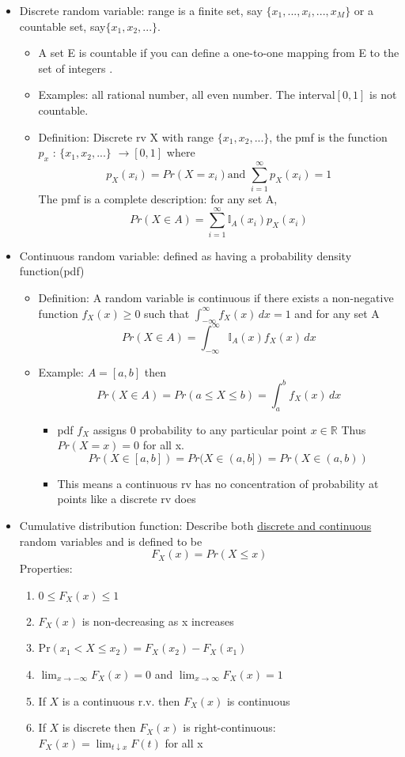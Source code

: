 \documentclass[12pt]{article}
\begin{document}
\begin{itemize}
\begin{itemize}
\end{itemize}
\item Discrete random variable: range is a finite set, say $\{x_1,...,x_i,...,x_M \}$ or a countable set, say$\{x_1,x_2,... \}$.
\begin{itemize}
\item A set E is countable if you can define a one-to-one mapping from E to the set of integers .
\item Examples: all rational number, all even number. The interval$[0,1]$ is not countable.
\item Definition: Discrete rv X with range $\{x_1,x_2,... \}$, the pmf is the function $p_x$ : $\{x_1,x_2,... \}$ $\rightarrow [0,1]$ where 
$$p_X(x_i) = Pr(X=x_i) \textrm{and } \sum_{i=1}^\infty p_X(x_i) = 1 $$ 
The pmf is a complete description: for any set A,
$$ Pr(X \in A) = \sum_{i=1}^\infty \mathbb{I}_A(x_i)p_X(x_i) $$

\end{itemize}
\item Continuous random variable: defined as having a probability density function(pdf)
\begin{itemize}
\item Definition: A random variable is continuous if there exists a non-negative function $f_X(x) \ge 0 $ such that $\int_{-\infty}^\infty f_X(x) \, dx = 1$ and for any set A
$$ Pr(X \in A) = \int_{-\infty}^\infty \mathbb{I}_A(x)f_X(x) \, dx  $$
\item Example: $A = [a,b]$ then 
$$Pr(X \in A) = Pr(a \le X \le b) = \int_a^b f_X(x) \, dx$$
\begin{itemize}
\item pdf $f_X$ assigns 0 probability to any particular point $x \in \mathbb{R}$ Thus $Pr(X=x)=0$ for all x.
$$Pr(X \in [a,b]) = Pr(X \in (a,b]) = Pr(X \in (a,b))$$
\item This means a continuous rv has no concentration of probability at points like a discrete rv does 
\end{itemize}
\end{itemize}
\item Cumulative distribution function: Describe both \underline{discrete and continuous} random variables and is defined to be 
$$F_X(x) = Pr(X \le x)$$
Properties:
\begin{enumerate}

\item $0 \le F_X(x) \le 1$
\item $F_X(x)$ is  non-decreasing as x increases
\item Pr$(x_1 < X \le x_2) = F_X(x_2) - F_X(x_1)$
\item $\lim_{x \rightarrow -\infty} F_X(x) = 0$ and $\lim_{x \rightarrow \infty} F_X(x) = 1$ 
\item If $X$ is a continuous r.v. then $F_X(x)$ is continuous 
\item If $X$ is discrete then $F_X(x)$ is right-continuous: $F_X(x) = \lim_{t \downarrow x} F(t) $ for all x


\end{enumerate}
\end{itemize}
\end{document}
